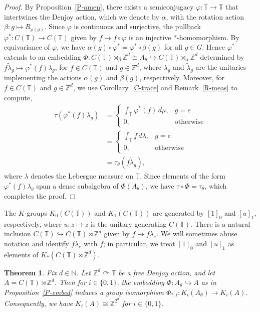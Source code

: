\documentclass[11pt,a4paper,leqno]{amsart}
\newtheorem{thm}{Theorem}[section]
\theoremstyle{definition}
\theoremstyle{remark}
\numberwithin{equation}{section}
\theoremstyle{plain}
\newcommand{\Nb}{\mathbb{N}}
\newcommand{\Zb}{\mathbb{Z}}
\newcommand{\Tb}{\mathbb{T}}
\begin{document}
\begin{proof}
	By Proposition~\ref{P-amen}, there exists a semiconjugacy $\varphi : \Tb \to \Tb$ that intertwines the Denjoy action, which we denote by $\alpha$, with the rotation action $\beta : g \mapsto R_{\rho(g)}$. Since $\varphi$ is continuous and surjective, the pullback $\varphi^* : C(\Tb) \to C(\Tb)$ given by $f\mapsto f\circ \varphi$ is an injective $*$-homomorphism. By equivariance of $\varphi$, we have $\alpha(g)\circ \varphi^* = \varphi^*\circ \beta(g)$ for all $g\in G$. Hence $\varphi^*$ extends to an embedding $\Phi : C(\Tb)\rtimes_{\beta} \Zb^d \cong A_\theta \hookrightarrow C(\Tb)\rtimes_{\alpha} \Zb^d$ determined by $f\tilde{\lambda}_g \mapsto \varphi^*(f)\lambda_g$, for $f\in C(\Tb)$ and $g\in \Zb^d$, where $\lambda_g$ and $\tilde{\lambda}_g$ are the unitaries implementing the actions $\alpha(g)$ and $\beta(g)$, respectively. Moreover, for $f \in C(\Tb)$ and $g\in \Zb^d$, we use Corollary~\ref{C-trace} and Remark~\ref{R-meas} to compute, 
	\begin{align*}
		\tau(\varphi^*(f)\lambda_g) &= \begin{cases}
		\displaystyle \int_{\Tb} \varphi^*(f) \, d\mu, & g = e\\
		0, & \text{otherwise} 
		\end{cases}\\
		& = \begin{cases}
		\displaystyle \int_{\Tb} f\, d\lambda, & g = e\\
		0, & \text{otherwise} 
		\end{cases}\\
		&= \tau_{\theta}(f\tilde{\lambda}_g),
	\end{align*}
	where $\lambda$ denotes the Lebesgue measure on $\Tb$. Since elements of the form $\varphi^*(f)\lambda_g$ span a dense subalgebra of $\Phi(A_\theta)$, we have $\tau \circ \Phi = \tau_{\theta}$, which completes the proof.
\end{proof}

The $K$-groups $K_0(C(\Tb))$ and $K_1(C(\Tb))$ are generated by $[1]_0$ and $[u]_1$, respectively, where $u : z\mapsto z$ is the unitary generating $C(\Tb)$. There is a natural inclusion $C(\Tb)\hookrightarrow C(\Tb)\rtimes \Zb^d$ given by $f \mapsto f\lambda_e$. We will sometimes abuse notation and identify $f\lambda_e$ with $f$; in particular, we treat $[1]_0$ and $[u]_1$ as elements of $K_*(C(\Tb)\rtimes \Zb^d)$. 

\begin{thm}\label{T-Kthy}
	Fix $d\in \Nb$. Let $\Zb^d \curvearrowright \Tb$ be a free Denjoy action, and let $A = C(\Tb) \rtimes \Zb^d$. Then for $i\in\{0,1\}$, the embedding $\Phi : A_\theta \hookrightarrow A$ as in Proposition~\ref{P-embed} induces a group isomorphism $\Phi_{*,i} : K_i(A_\theta) \to K_i(A)$. Consequently, we have $K_i(A) \cong \Zb^{2^d}$ for $i\in \{0,1\}$.
\end{thm}
\end{document}
